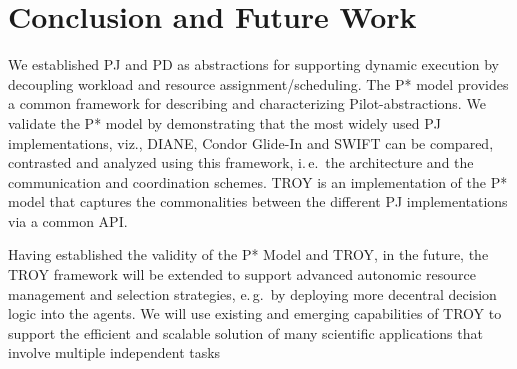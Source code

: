 \documentclass[conference,final]{IEEEtran}
\newcommand{\note}[1]{ {\textcolor{magenta} { ***Note: #1 }}}
\newcommand{\note}[1]{}
\newcommand{\up}{\vspace*{-1em}}
\newcommand{\upp}{\vspace*{-0.5em}}
\begin{document}

\upp


\section{Conclusion and Future Work\upp\upp}


We established PJ and PD as abstractions for supporting dynamic
execution by decoupling workload and resource
assignment/scheduling. The P* model provides a common framework for
describing and characterizing Pilot-abstractions.  We validate the P*
model by demonstrating that the most widely used PJ implementations,
viz., DIANE, Condor Glide-In and SWIFT can be compared, contrasted and
analyzed using this framework, i.\,e.\ the architecture and the
communication and coordination schemes.  TROY is an implementation of
the P* model that captures the commonalities between the different PJ
implementations via a common API.


Having established the validity of the P* Model and TROY, in the
future, the TROY framework will be extended to support advanced
autonomic resource management and selection strategies, e.\,g.\ by
deploying more decentral decision logic into the agents. We will use
existing and emerging capabilities of TROY to support the efficient
and scalable solution of many scientific applications that involve
multiple independent tasks




\up
\end{document}
